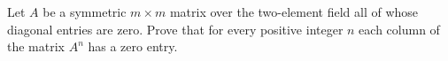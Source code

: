 Let \(A\) be a symmetric \(m\times m\) matrix over the two-element field all of whose diagonal entries are zero. Prove that for every positive integer \(n\) each column of the matrix \(A^n\) has a zero entry.